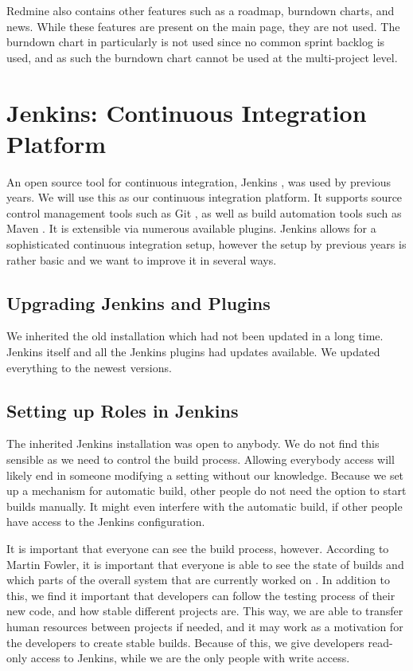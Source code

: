 Redmine also contains other features such as a roadmap, burndown charts, and news. While these features are present on the main page, they are not used. The burndown chart in particularly is not used since no common sprint backlog is used, and as such the burndown chart cannot be used at the multi-project level.


\section{Jenkins: Continuous Integration Platform}\label{sec:jenkins}
An open source tool for continuous integration, Jenkins \parencite{JenkinsWebsite}, was used by previous years. We will use this as our continuous integration platform. It supports source control management tools such as Git \parencite{gitwebsite}, as well as build automation tools such as Maven \parencite{mavenwebsite}. It is extensible via numerous available plugins. Jenkins allows for a sophisticated continuous integration setup, however the setup by previous years is rather basic and we want to improve it in several ways.

\subsection{Upgrading Jenkins and Plugins}
We inherited the old installation which had not been updated in a long time. Jenkins itself and all the Jenkins plugins had updates available. We updated everything to the newest versions.

\subsection{Setting up Roles in Jenkins}
The inherited Jenkins installation was open to anybody. We do not find this sensible as we need to control the build process. Allowing everybody access will likely end in someone modifying a setting without our knowledge. Because we set up a mechanism for automatic build, other people do not need the option to start builds manually. It might even interfere with the automatic build, if other people have access to the Jenkins configuration.

It is important that everyone can see the build process, however. According to Martin Fowler, it is important that everyone is able to see the state of builds and which parts of the overall system that are currently worked on \parencite{fowlerCI}. In addition to this, we find it important that developers can follow the testing process of their new code, and how stable different projects are. This way, we are able to transfer human resources between projects if needed, and it may work as a motivation for the developers to create stable builds. Because of this, we give developers read-only access to Jenkins, while we are the only people with write access.

